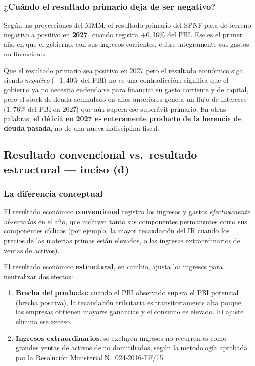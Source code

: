 \documentclass[12pt, a4paper]{article}
\newcommand{\emp}[1]{\textbf{#1}}
\begin{document}
\subsubsection*{¿Cuándo el resultado primario deja de ser negativo?}

Según las proyecciones del MMM, el resultado primario del SPNF pasa de terreno
negativo a positivo en \emp{2027}, cuando registra $+0{,}36\%$ del PBI.
Ese es el primer año en que el gobierno, con sus ingresos corrientes, cubre
íntegramente sus gastos no financieros.

\begin{tcolorbox}[title={Interpretación clave}]
Que el resultado primario sea positivo en 2027 pero el resultado económico siga
siendo \emph{negativo} ($-1{,}40\%$ del PBI) no es una contradicción: significa
que el gobierno ya no necesita endeudarse para financiar su gasto corriente y de
capital, pero el stock de deuda acumulado en años anteriores genera un flujo
de intereses ($1{,}76\%$ del PBI en 2027) que aún supera ese superávit primario.
En otras palabras, \emp{el déficit en 2027 es enteramente producto de la herencia
de deuda pasada}, no de una nueva indisciplina fiscal.
\end{tcolorbox}

\subsection{Resultado convencional vs.\ resultado estructural ---
            inciso (d)}

\subsubsection*{La diferencia conceptual}

El resultado económico \emp{convencional} registra los ingresos y gastos
\emph{efectivamente observados} en el año, que incluyen tanto sus componentes
permanentes como sus componentes cíclicos (por ejemplo, la mayor recaudación
del IR cuando los precios de las materias primas están elevados, o los ingresos
extraordinarios de ventas de activos).

El resultado económico \emp{estructural}, en cambio, ajusta los ingresos para
neutralizar dos efectos:

\begin{enumerate}[label=(\roman*), leftmargin=2.5em]
    \item \emp{Brecha del producto:} cuando el PBI observado supera el PBI
          potencial (brecha positiva), la recaudación tributaria es
          transitoriamente alta porque las empresas obtienen mayores ganancias
          y el consumo es elevado. El ajuste elimina ese exceso.
    \item \emp{Ingresos extraordinarios:} se excluyen ingresos no recurrentes
          como grandes ventas de activos de no domiciliados, según la
          metodología aprobada por la Resolución Ministerial
          N.\textordmasculine~024-2016-EF/15.
\end{enumerate}
\end{document}
